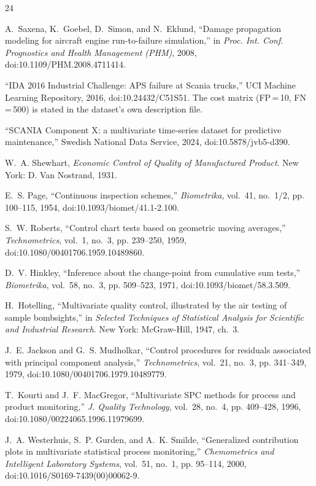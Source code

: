 \documentclass[journal]{IEEEtran}
\begin{document}
\begin{thebibliography}{24}

 A.~Saxena, K.~Goebel, D.~Simon, and N.~Eklund, ``Damage propagation modeling for
aircraft engine run-to-failure simulation,'' in \emph{Proc. Int. Conf. Prognostics and Health Management
(PHM)}, 2008, doi:10.1109/PHM.2008.4711414.

 ``IDA 2016 Industrial Challenge: APS failure at Scania trucks,'' UCI Machine Learning
Repository, 2016, doi:10.24432/C51S51. The cost matrix (FP\,=\,10, FN\,=\,500) is stated in the dataset's
own description file.

 ``SCANIA Component X: a multivariate time-series dataset for predictive
maintenance,'' Swedish National Data Service, 2024, doi:10.5878/jvb5-d390.

 W.~A. Shewhart, \emph{Economic Control of Quality of Manufactured Product}. New
York: D. Van Nostrand, 1931.

 E.~S. Page, ``Continuous inspection schemes,'' \emph{Biometrika}, vol.~41, no.~1/2,
pp. 100--115, 1954, doi:10.1093/biomet/41.1-2.100.

 S.~W. Roberts, ``Control chart tests based on geometric moving averages,''
\emph{Technometrics}, vol.~1, no.~3, pp. 239--250, 1959, doi:10.1080/00401706.1959.10489860.

 D.~V. Hinkley, ``Inference about the change-point from cumulative sum tests,''
\emph{Biometrika}, vol.~58, no.~3, pp. 509--523, 1971, doi:10.1093/biomet/58.3.509.

 H.~Hotelling, ``Multivariate quality control, illustrated by the air testing of
sample bombsights,'' in \emph{Selected Techniques of Statistical Analysis for Scientific and Industrial
Research}. New York: McGraw-Hill, 1947, ch.~3.

 J.~E. Jackson and G.~S. Mudholkar, ``Control procedures for residuals associated
with principal component analysis,'' \emph{Technometrics}, vol.~21, no.~3, pp. 341--349, 1979,
doi:10.1080/00401706.1979.10489779.

 T.~Kourti and J.~F. MacGregor, ``Multivariate SPC methods for process and product
monitoring,'' \emph{J. Quality Technology}, vol.~28, no.~4, pp. 409--428, 1996,
doi:10.1080/00224065.1996.11979699.

 J.~A. Westerhuis, S.~P. Gurden, and A.~K. Smilde, ``Generalized contribution
plots in multivariate statistical process monitoring,'' \emph{Chemometrics and Intelligent Laboratory
Systems}, vol.~51, no.~1, pp. 95--114, 2000, doi:10.1016/S0169-7439(00)00062-9.


\end{thebibliography}
\end{document}

